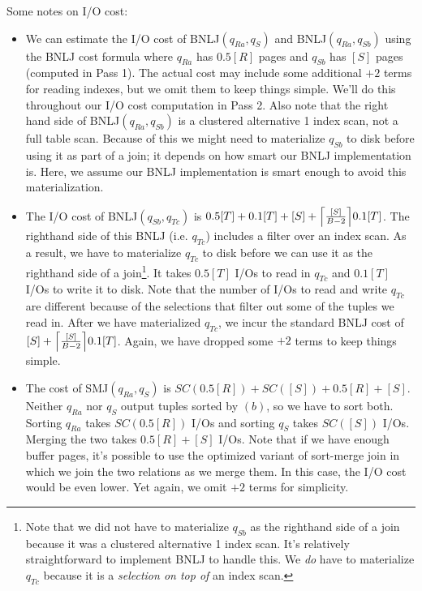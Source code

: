 \documentclass{article}
\begin{document}
Some notes on I/O cost:
\begin{itemize}
  \item
    We can estimate the I/O cost of BNLJ$(q_{Ra}, q_{S})$ and BNLJ$(q_{Ra},
    q_{Sb})$ using the BNLJ cost formula where $q_{Ra}$ has $0.5[R]$ pages and
    $q_{Sb}$ has $[S]$ pages (computed in Pass 1). The actual cost may include
    some additional $+2$ terms for reading indexes, but we omit them to keep
    things simple. We'll do this throughout our I/O cost computation in Pass 2.
    Also note that the right hand side of BNLJ$(q_{Ra}, q_{Sb})$ is a
    clustered alternative 1 index scan, not a full table scan. Because of this
    we might need to materialize $q_{Sb}$ to disk before using it as part of a
    join; it depends on how smart our BNLJ implementation is. Here, we assume
    our BNLJ implementation is smart enough to avoid this materialization.

  \item
    The I/O cost of BNLJ$(q_{Sb}, q_{Tc})$ is $0.5[T] + 0.1[T] +
    \bnlj{[S]}{0.1[T]}$. The righthand side of this BNLJ (i.e. $q_{Tc}$)
    includes a filter over an index scan. As a result, we have to materialize
    $q_{Tc}$ to disk before we can use it as the righthand side of a
    join\footnote{Note that we did not have to materialize $q_{Sb}$ as the
    righthand side of a join because it was a clustered alternative 1 index
    scan. It's relatively straightforward to implement BNLJ to handle this. We
    \emph{do} have to materialize $q_{Tc}$ because it is a \emph{selection on top
    of} an index scan.}. It takes $0.5[T]$ I/Os to read in $q_{Tc}$ and
    $0.1[T]$ I/Os to write it to disk. Note that the number of I/Os to read and
    write $q_{Tc}$ are different because of the selections that filter out some
    of the tuples we read in. After we have materialized $q_{Tc}$, we incur the
    standard BNLJ cost of $\bnlj{[S]}{0.1[T]}$. Again, we have dropped some
    $+2$ terms to keep things simple.

  \item
    The cost of SMJ$(q_{Ra}, q_{S})$ is $SC(0.5[R]) + SC([S]) + 0.5[R] + [S]$.
    Neither $q_{Ra}$ nor $q_S$ output tuples sorted by $(b)$, so we have to
    sort both. Sorting $q_{Ra}$ takes $SC(0.5[R])$ I/Os and sorting $q_S$ takes
    $SC([S])$ I/Os. Merging the two takes $0.5[R] + [S]$ I/Os. Note that if we
    have enough buffer pages, it's possible to use the optimized variant of
    sort-merge join in which we join the two relations as we merge them. In
    this case, the I/O cost would be even lower. Yet again, we omit $+2$ terms
    for simplicity.


\end{itemize}
\end{document}
